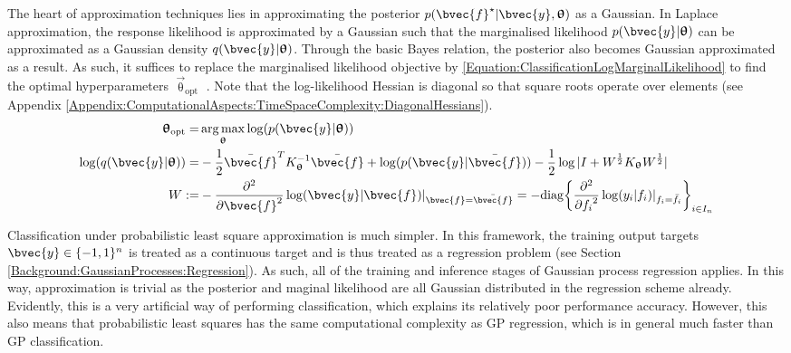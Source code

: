 				The heart of approximation techniques lies in approximating the posterior $p(\bvec{f}^{\star} | \bvec{y}, \vec{\uptheta})$ as a Gaussian. In Laplace approximation, the response likelihood is approximated by a Gaussian such that the marginalised likelihood $p(\bvec{y} | \vec{\uptheta})$ can be approximated as a Gaussian density $q(\bvec{y} | \vec{\uptheta})$. Through the basic Bayes relation, the posterior also becomes Gaussian approximated as a result. As such, it suffices to replace the marginalised likelihood objective by \eqref{Equation:ClassificationLogMarginalLikelihood} to find the optimal hyperparameters $\vec{\uptheta}_{\mathrm{opt}}$ \citep{GaussianProcessForMachineLearning}. Note that the log-likelihood Hessian is diagonal so that square roots operate over elements (see Appendix \ref{Appendix:ComputationalAspects:TimeSpaceComplexity:DiagonalHessians}). \begin{equation}
					\begin{aligned}
						\vec{\uptheta}_{\mathrm{opt}} =& \argmax_{\vec{\uptheta}} \log(p(\bvec{y} | \vec{\uptheta})) \\
						\log(q(\bvec{y} | \vec{\uptheta})) =& - \frac{1}{2} \bar{\bvec{f}}^{T} K_{\vec{\uptheta}}^{-1} \bar{\bvec{f}} + \log(p(\bvec{y} | \bar{\bvec{f}})) - \frac{1}{2} \log|I + W^{\frac{1}{2}} K_{\vec{\uptheta}} W^{\frac{1}{2}}| \\
						W :=& - \frac{\partial^{2}}{{\partial \bvec{f}}^{2}} \log(\bvec{y} | \bvec{f}) |_{\bvec{f} = \bar{\bvec{f}}} = - \mathrm{diag} \bigg\{  \frac{\partial^{2}}{{\partial f_{i}}^{2}} \log(y_{i} | f_{i}) |_{f_{i} = \bar{f}_{i}} \bigg\}_{i \in I_{n}}
					\end{aligned}
				\label{Equation:ClassificationLogMarginalLikelihood}
				\end{equation}
				
				Classification under probabilistic least square approximation is much simpler. In this framework, the training output targets $\bvec{y} \in \{-1, 1\}^{n}$ is treated as a continuous target and is thus treated as a regression problem (see Section \ref{Background:GaussianProcesses:Regression}). As such, all of the training and inference stages of Gaussian process regression applies. In this way, approximation is trivial as the posterior and maginal likelihood are all Gaussian distributed in the regression scheme already. Evidently, this is a very artificial way of performing classification, which explains its relatively poor performance accuracy. However, this also means that probabilistic least squares has the same computational complexity as GP regression, which is in general much faster than GP classification.
				
